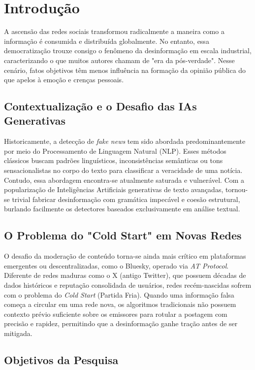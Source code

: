 \chapter{Introdução}

A ascensão das redes sociais transformou radicalmente a maneira como a informação é consumida e distribuída globalmente. No entanto, essa democratização trouxe consigo o fenômeno da desinformação em escala industrial, caracterizando o que muitos autores chamam de "era da pós-verdade". Nesse cenário, fatos objetivos têm menos influência na formação da opinião pública do que apelos à emoção e crenças pessoais.

\section{Contextualização e o Desafio das IAs Generativas}

Historicamente, a detecção de \textit{fake news} tem sido abordada predominantemente por meio do Processamento de Linguagem Natural (NLP). Esses métodos clássicos buscam padrões linguísticos, inconsistências semânticas ou tons sensacionalistas no corpo do texto para classificar a veracidade de uma notícia. Contudo, essa abordagem encontra-se atualmente saturada e vulnerável. Com a popularização de Inteligências Artificiais generativas de texto avançadas, tornou-se trivial fabricar desinformação com gramática impecável e coesão estrutural, burlando facilmente os detectores baseados exclusivamente em análise textual.

\section{O Problema do "Cold Start" em Novas Redes}

O desafio da moderação de conteúdo torna-se ainda mais crítico em plataformas emergentes ou descentralizadas, como o Bluesky, operado via \textit{AT Protocol}. Diferente de redes maduras como o X (antigo Twitter), que possuem décadas de dados históricos e reputação consolidada de usuários, redes recém-nascidas sofrem com o problema do \textit{Cold Start} (Partida Fria). Quando uma informação falsa começa a circular em uma rede nova, os algoritmos tradicionais não possuem contexto prévio suficiente sobre os emissores para rotular a postagem com precisão e rapidez, permitindo que a desinformação ganhe tração antes de ser mitigada.

\section{Objetivos da Pesquisa}

